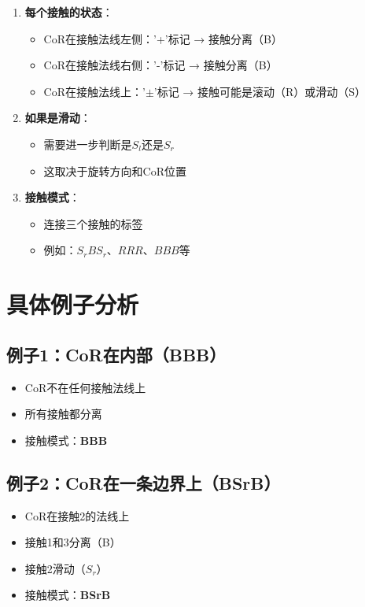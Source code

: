\documentclass[12pt,a4paper]{article}
\begin{document}
\begin{enumerate}
\item \textbf{每个接触的状态}：
   \begin{itemize}
   \item CoR在接触法线左侧：'+'标记 → 接触分离（B）
   \item CoR在接触法线右侧：'-'标记 → 接触分离（B）
   \item CoR在接触法线上：'$\pm$'标记 → 接触可能是滚动（R）或滑动（S）
   \end{itemize}

\item \textbf{如果是滑动}：
   \begin{itemize}
   \item 需要进一步判断是$S_l$还是$S_r$
   \item 这取决于旋转方向和CoR位置
   \end{itemize}

\item \textbf{接触模式}：
   \begin{itemize}
   \item 连接三个接触的标签
   \item 例如：$S_rBS_r$、$RRR$、$BBB$等
   \end{itemize}
\end{enumerate}

\section{具体例子分析}

\subsection{例子1：CoR在内部（BBB）}

\begin{itemize}
\item CoR不在任何接触法线上
\item 所有接触都分离
\item 接触模式：\textbf{BBB}
\end{itemize}

\subsection{例子2：CoR在一条边界上（BSrB）}

\begin{itemize}
\item CoR在接触2的法线上
\item 接触1和3分离（B）
\item 接触2滑动（$S_r$）
\item 接触模式：\textbf{BSrB}
\end{itemize}
\end{document}
